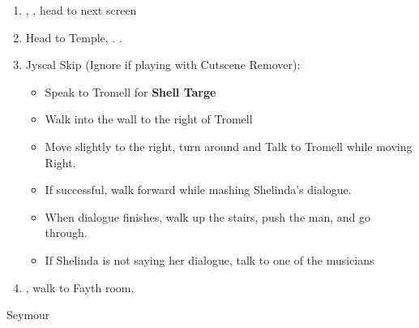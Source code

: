 \begin{enumerate}[resume]
	\item \sd, \cs[0:40], head to next screen
	\item Head to Temple, \sd. \save.
	\wincb
	\item Jyscal Skip (Ignore if playing with Cutscene Remover):
	      \begin{itemize}
		      \item Speak to Tromell for \textbf{Shell Targe}
		      \item Walk into the wall to the right of Tromell
		      \item Move slightly to the right, turn around and Talk to Tromell while moving Right.
		      \item If successful, walk forward while mashing Shelinda's dialogue.
		      \item When dialogue finishes, walk up the stairs, push the man, and go through.
		      \item If Shelinda is not saying her dialogue, talk to one of the musicians
	      \end{itemize}
	\item \sd, walk to Fayth room, \cs[2:10]
\end{enumerate}
\bothvfill
\begin{battle}[3000]{Seymour}
	\begin{itemize}
	\end{itemize}
\end{battle}
\bothvfill
\lossvfill
